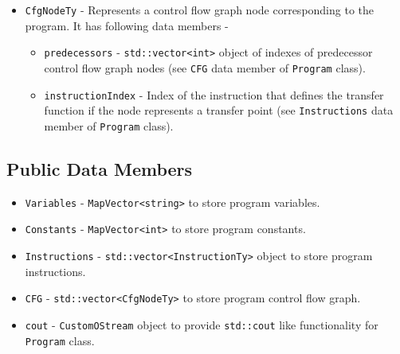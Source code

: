 \begin{itemize}
    \item \texttt{CfgNodeTy} - Represents a control flow graph node corresponding to the program. It has following data members -
        \begin{itemize} \tightlist
            \item \texttt{predecessors} - \texttt{std::vector<int>} object of indexes of predecessor control flow graph nodes (see \texttt{CFG} data member of \texttt{Program} class).
            \item \texttt{instructionIndex} - Index of the instruction that defines the transfer function if the node represents a transfer point (see \texttt{Instructions} data member of \texttt{Program} class).
        \end{itemize}
\end{itemize}

\subsection{Public Data Members}
\label{subsec:PublicDataMembersProgramH}
\begin{itemize} \tightlist
    \item \texttt{Variables} - \texttt{MapVector<string>} to store program variables.
    \item \texttt{Constants} - \texttt{MapVector<int>} to store program constants.
    \item \texttt{Instructions} - \texttt{std::vector<InstructionTy>} object to store program instructions.
    \item \texttt{CFG} - \texttt{std::vector<CfgNodeTy>} to store program control flow graph.
    \item \texttt{cout} - \texttt{CustomOStream} object to provide \texttt{std::cout} like functionality for \texttt{Program} class.
\end{itemize}

